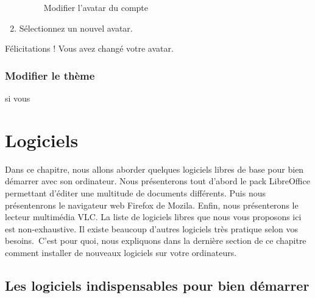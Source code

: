 \documentclass[12pt]{book}
\begin{document}
\begin{enumerate}
\begin{figure}[h]
				\caption{Modifier l'avatar du compte}
				\label{fig:avataruser}
			\end{figure}
			\item Sélectionnez un nouvel avatar.
		\end{enumerate}
		Félicitations ! Vous avez changé votre avatar.
	\subsection{Modifier le thème}
		si vous 

\chapter{Logiciels}
Dans ce chapitre, nous allons aborder quelques logiciels libres de base pour bien démarrer avec son ordinateur.
Nous présenterons tout d'abord le pack LibreOffice permettant d'éditer une multitude de documents différents.
Puis nous présentenrons le navigateur web Firefox de Mozila.
Enfin, nous présenterons le lecteur multimédia VLC.
La liste de logiciels libres que nous vous proposons ici est non-exhaustive.
Il existe beaucoup d'autres logiciels très pratique selon vos besoins.\
C'est pour quoi, nous expliquons dans la dernière section de ce chapitre comment installer de nouveaux logiciels sur votre ordinateurs.
\section{Les logiciels indispensables pour bien démarrer}
\end{document}
